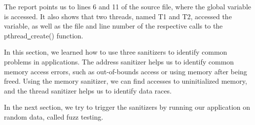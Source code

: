 The report points us to lines 6 and 11 of the source file, where the global variable is accessed. It also shows that two threads, named T1 and T2, accessed the variable, as well as the file and line number of the respective calls to the pthread\underline{~}create() function.\par

In this section, we learned how to use three sanitizers to identify common problems in applications. The address sanitizer helps us to identify common memory access errors, such as out-of-bounds access or using memory after being freed. Using the memory sanitizer, we can find accesses to uninitialized memory, and the thread sanitizer helps us to identify data races.\par

In the next section, we try to trigger the sanitizers by running our application on random data, called fuzz testing.\par




















